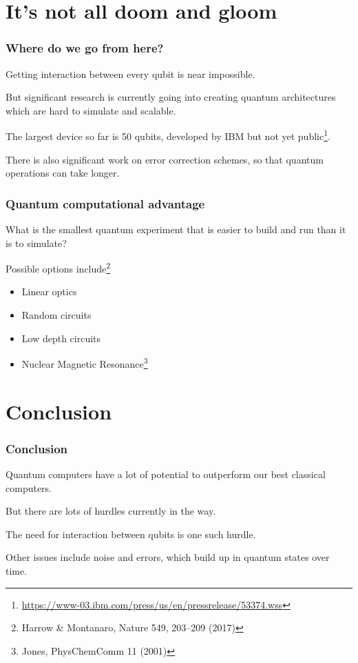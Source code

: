 \documentclass[notes]{beamer}
\begin{document}
\section{It's not all doom and gloom}

\begin{frame}
\frametitle{Where do we go from here?}

Getting interaction between every qubit is near impossible.

But significant research is currently going into creating quantum architectures which are hard to simulate and scalable.

The largest device so far is 50 qubits, developed by IBM but not yet public\footnote{\url{https://www-03.ibm.com/press/us/en/pressrelease/53374.wss}}.

There is also significant work on error correction schemes, so that quantum operations can take longer.
\end{frame}

\begin{frame}
\frametitle{Quantum computational advantage}

What is the smallest quantum experiment that is easier to build and run than it is to simulate?

Possible options include\footnote{Harrow \& Montanaro, Nature 549, 203–209 (2017)}
\begin{itemize}
\item Linear optics
\item Random circuits
\item Low depth circuits
\item Nuclear Magnetic Resonance\footnote{Jones, PhysChemComm 11 (2001)}
\end{itemize}
\end{frame}

\section{Conclusion}

\begin{frame}
\frametitle{Conclusion}

Quantum computers have a lot of potential to outperform our best classical computers.

But there are lots of hurdles currently in the way.

The need for interaction between qubits is one such hurdle.

Other issues include noise and errors, which build up in quantum states over time.

\end{frame}
\end{document}
